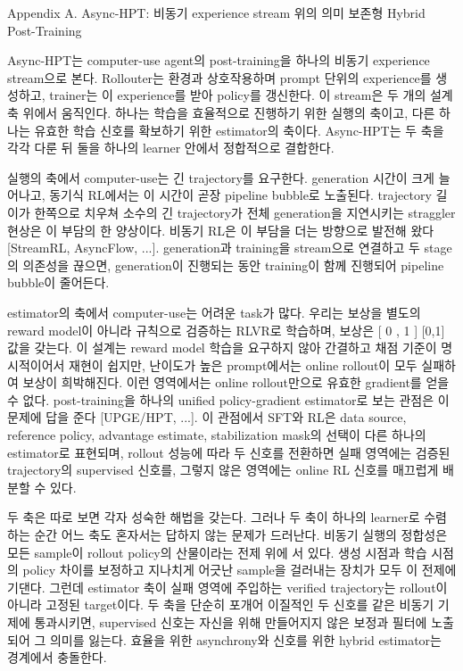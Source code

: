 
Appendix A. Async-HPT: 비동기 experience stream 위의 의미 보존형 Hybrid Post-Training

Async-HPT는 computer-use agent의 post-training을 하나의 비동기 experience stream으로 본다. Rollouter는 환경과 상호작용하며 prompt 단위의 experience를 생성하고, trainer는 이 experience를 받아 policy를 갱신한다. 이 stream은 두 개의 설계 축 위에서 움직인다. 하나는 학습을 효율적으로 진행하기 위한 실행의 축이고, 다른 하나는 유효한 학습 신호를 확보하기 위한 estimator의 축이다. Async-HPT는 두 축을 각각 다룬 뒤 둘을 하나의 learner 안에서 정합적으로 결합한다.

실행의 축에서 computer-use는 긴 trajectory를 요구한다. generation 시간이 크게 늘어나고, 동기식 RL에서는 이 시간이 곧장 pipeline bubble로 노출된다. trajectory 길이가 한쪽으로 치우쳐 소수의 긴 trajectory가 전체 generation을 지연시키는 straggler 현상은 이 부담의 한 양상이다. 비동기 RL은 이 부담을 더는 방향으로 발전해 왔다 [StreamRL, AsyncFlow, ...]. generation과 training을 stream으로 연결하고 두 stage의 의존성을 끊으면, generation이 진행되는 동안 training이 함께 진행되어 pipeline bubble이 줄어든다. 

estimator의 축에서 computer-use는 어려운 task가 많다. 우리는 보상을 별도의 reward model이 아니라 규칙으로 검증하는 RLVR로 학습하며, 보상은 
[
0
,
1
]
[0,1] 값을 갖는다. 이 설계는 reward model 학습을 요구하지 않아 간결하고 채점 기준이 명시적이어서 재현이 쉽지만, 난이도가 높은 prompt에서는 online rollout이 모두 실패하여 보상이 희박해진다. 이런 영역에서는 online rollout만으로 유효한 gradient를 얻을 수 없다. post-training을 하나의 unified policy-gradient estimator로 보는 관점은 이 문제에 답을 준다 [UPGE/HPT, ...]. 이 관점에서 SFT와 RL은 data source, reference policy, advantage estimate, stabilization mask의 선택이 다른 하나의 estimator로 표현되며, rollout 성능에 따라 두 신호를 전환하면 실패 영역에는 검증된 trajectory의 supervised 신호를, 그렇지 않은 영역에는 online RL 신호를 매끄럽게 배분할 수 있다.

두 축은 따로 보면 각자 성숙한 해법을 갖는다. 그러나 두 축이 하나의 learner로 수렴하는 순간 어느 축도 혼자서는 답하지 않는 문제가 드러난다. 비동기 실행의 정합성은 모든 sample이 rollout policy의 산물이라는 전제 위에 서 있다. 생성 시점과 학습 시점의 policy 차이를 보정하고 지나치게 어긋난 sample을 걸러내는 장치가 모두 이 전제에 기댄다. 그런데 estimator 축이 실패 영역에 주입하는 verified trajectory는 rollout이 아니라 고정된 target이다. 두 축을 단순히 포개어 이질적인 두 신호를 같은 비동기 기제에 통과시키면, supervised 신호는 자신을 위해 만들어지지 않은 보정과 필터에 노출되어 그 의미를 잃는다. 효율을 위한 asynchrony와 신호를 위한 hybrid estimator는 경계에서 충돌한다.

